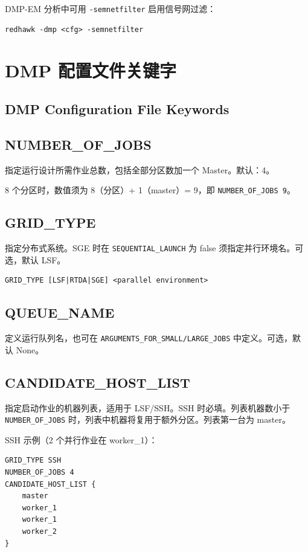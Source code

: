 DMP-EM 分析中可用 \texttt{-semnetfilter} 启用信号网过滤：
\begin{lstlisting}
redhawk -dmp <cfg> -semnetfilter
\end{lstlisting}

\section{DMP 配置文件关键字}
\subsection*{DMP Configuration File Keywords}

\subsection{NUMBER\_OF\_JOBS}
指定运行设计所需作业总数，包括全部分区数加一个 Master。默认：4。

\begin{noteBox}
8 个分区时，数值须为 8（分区）+ 1（master）= 9，即 \texttt{NUMBER\_OF\_JOBS 9}。
\end{noteBox}

\subsection{GRID\_TYPE}
指定分布式系统。SGE 时在 \texttt{SEQUENTIAL\_LAUNCH} 为 false 须指定并行环境名。可选，默认 LSF。
\begin{lstlisting}
GRID_TYPE [LSF|RTDA|SGE] <parallel environment>
\end{lstlisting}

\subsection{QUEUE\_NAME}
定义运行队列名，也可在 \texttt{ARGUMENTS\_FOR\_SMALL/LARGE\_JOBS} 中定义。可选，默认 None。

\subsection{CANDIDATE\_HOST\_LIST}
指定启动作业的机器列表，适用于 LSF/SSH。SSH 时必填。列表机器数小于 \texttt{NUMBER\_OF\_JOBS} 时，列表中机器将复用于额外分区。列表第一台为 master。

SSH 示例（2 个并行作业在 worker\_1）：
\begin{lstlisting}
GRID_TYPE SSH
NUMBER_OF_JOBS 4
CANDIDATE_HOST_LIST {
    master
    worker_1
    worker_1
    worker_2
}
\end{lstlisting}

